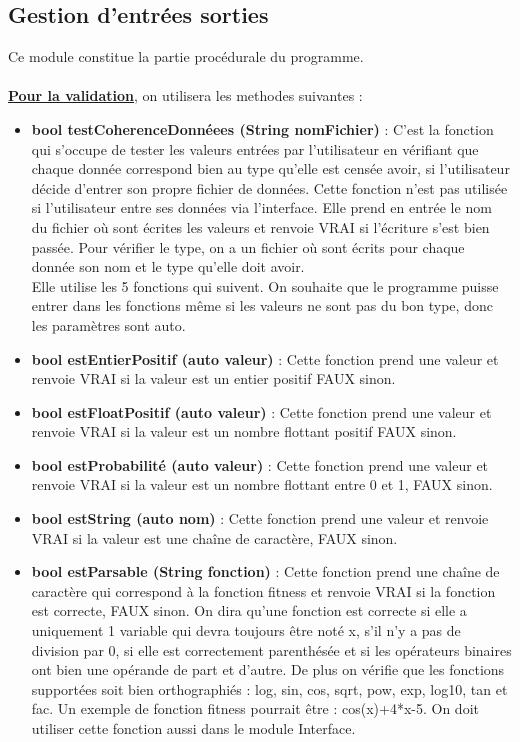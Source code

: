 \documentclass[a4paper,11pt]{article}
\begin{document}
		\subsection{Gestion d'entrées sorties}
			Ce module constitue la partie procédurale du programme.\\
			\\
			\underline{\bf Pour la validation}, on utilisera les methodes suivantes :\\
			\begin{itemize}
				\item \textbf{bool testCoherenceDonnéees (String nomFichier)} : C’est la fonction qui s’occupe de tester les valeurs entrées par l’utilisateur en vérifiant que chaque donnée correspond bien au type qu’elle est censée avoir, si l'utilisateur décide d'entrer son propre fichier de données. Cette fonction n'est pas utilisée si l'utilisateur entre ses données via l'interface.
					Elle prend en entrée le nom du fichier où sont écrites les valeurs et renvoie VRAI si l'écriture s'est bien passée.
					Pour vérifier le type, on a un fichier où sont écrits pour chaque donnée son nom et le type qu’elle doit avoir.\\
					Elle utilise les 5 fonctions qui suivent. On souhaite que le programme puisse entrer dans les fonctions même si les valeurs ne sont pas du bon type, donc les paramètres sont auto.\vspace{0.2cm}
				\item \textbf{bool estEntierPositif (auto valeur)} : Cette fonction prend une valeur et renvoie VRAI si la valeur est un entier positif FAUX sinon.\vspace{0.2cm}
				\item \textbf{bool estFloatPositif (auto valeur)} : Cette fonction prend une valeur et renvoie VRAI si la valeur est un nombre flottant positif FAUX sinon.\vspace{0.2cm}
				\item \textbf{bool estProbabilité (auto valeur)} : Cette fonction prend une valeur et renvoie VRAI si la valeur est un nombre flottant entre 0 et 1, FAUX sinon.\vspace{0.2cm}
				\item \textbf{bool estString (auto nom)} : 	Cette fonction prend une valeur et renvoie VRAI si la valeur est une chaîne de caractère, FAUX sinon.\vspace{0.2cm}
				\item \textbf{bool estParsable (String fonction)} : Cette fonction prend une chaîne de caractère qui correspond à la fonction fitness et renvoie VRAI si la fonction est correcte, FAUX sinon. On dira qu’une fonction est correcte si elle a uniquement 1 variable qui devra toujours être noté x, s’il n’y a pas de division par 0, si elle est correctement parenthésée et si les opérateurs binaires ont bien une opérande de part et d’autre. De plus on vérifie que les fonctions supportées soit bien orthographiés : log, sin, cos, sqrt, pow, exp, log10, tan et fac.  Un exemple de fonction fitness pourrait être : cos(x)+4*x-5. On doit utiliser cette fonction aussi dans le module Interface.\\
			\end{itemize}
			
\end{document}
